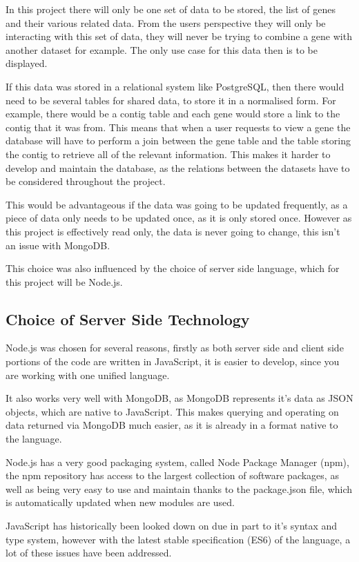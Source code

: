 In this project there will only be one set of data to be stored, the list of genes and their various related data. From the users perspective they will only be interacting with this set of data, they will never be trying to combine a gene with another dataset for example. The only use case for this data then is to be displayed. 

If this data was stored in a relational system like PostgreSQL, then there would need to be several tables for shared data, to store it in a normalised form. For example, there would be a contig table and each gene would store a link to the contig that it was from. This means that when a user requests to view a gene the database will have to perform a join between the gene table and the table storing the contig to retrieve all of the relevant information. This makes it harder to develop and maintain the database, as the relations between the datasets have to be considered throughout the project. 

This would be advantageous if the data was going to be updated frequently, as a piece of data only needs to be updated once, as it is only stored once. However as this project is effectively read only, the data is never going to change, this isn't an issue with MongoDB.

This choice was also influenced by the choice of server side language, which for this project will be Node.js. 

\subsection{Choice of Server Side Technology}
Node.js was chosen for several reasons, firstly as both server side and client side portions of the code are written in JavaScript, it is easier to develop, since you are working with one unified language. 

It also works very well with MongoDB, as MongoDB represents it's data as JSON objects, which are native to JavaScript. This makes querying and operating on data returned via MongoDB much easier, as it is already in a format native to the language. 

Node.js has a very good packaging system, called Node Package Manager (npm), the npm repository has access to the largest collection\cite{modulecounts} of software packages, as well as being very easy to use and maintain thanks to the package.json file, which is automatically updated when new modules are used. 

JavaScript has historically been looked down on due in part to it's syntax and type system, however with the latest stable specification\cite{es6} (ES6) of the language, a lot of these issues have been addressed. 

